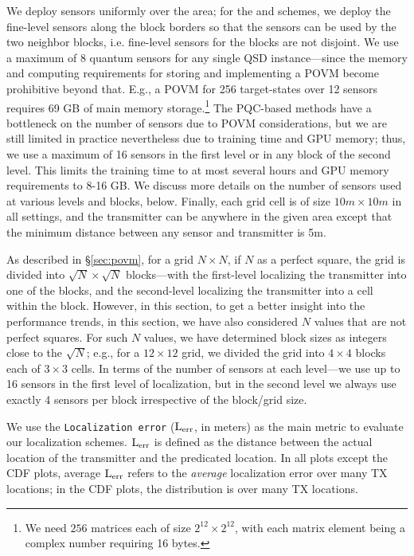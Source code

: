We deploy sensors uniformly over the area; for the \povm and  \pqctwo schemes, we deploy the fine-level sensors along the block borders so that the sensors can be used by the two neighbor blocks, i.e. fine-level sensors for the blocks are not disjoint.
We use a maximum of 8 quantum sensors for any single QSD instance---since the memory and computing requirements for storing and implementing a POVM become prohibitive beyond that. E.g., a POVM for 256 target-states over 12 sensors requires 69 GB of main memory storage.\footnote{We need $256$ matrices each of size $2^{12} \times 2^{12}$, with each matrix element being a complex number requiring 16 bytes.} 
The PQC-based methods have a bottleneck on the number of sensors due to POVM considerations, but 
we are still limited in practice nevertheless due to training time and GPU memory; thus, we 
use a maximum of 16 sensors in the first level or in any block of the second level. This limits
the training time to at most several hours and GPU memory requirements to 8-16 GB. 
We discuss more details on the number of sensors used at various levels and blocks, below.
Finally, each grid cell is of size $10m \times 10m$ in all settings, and the transmitter 
can be anywhere in the given area except that the minimum distance between any sensor
and transmitter is 5m.

As described in \S\ref{sec:povm}, for a grid $N \times N$, if $N$ as a perfect square, 
the grid is divided into $\sqrt{N} \times \sqrt{N}$ blocks---with the first-level localizing the transmitter into one of the blocks, and the second-level localizing
the transmitter into a cell within the block.
However, in this section, to get a better insight into the performance trends, in this section, we have also considered  $N$ values that are not perfect squares. 
For such $N$ values, we have determined block sizes as integers close to the $\sqrt{N}$; e.g., for a $12\times12$ grid, we divided the grid into $4 \times 4$ blocks each of $3 \times 3$ cells.
In terms of the number of sensors at each level---we use up to 16 sensors in the first level of localization, but in the second level we always use exactly 4 sensors per block irrespective of the block/grid size.

We use the {\tt Localization error} ($\mathrm{L_{err}}$, in meters) as the main metric to evaluate our localization schemes. $\mathrm{L_{err}}$ is defined as the distance between the actual location of the transmitter and the predicated location. 
In all plots except the CDF plots, average $\mathrm{L_{err}}$ refers to the
{\em average} localization error over many TX locations; 
in the CDF plots, the distribution is over many TX locations.

